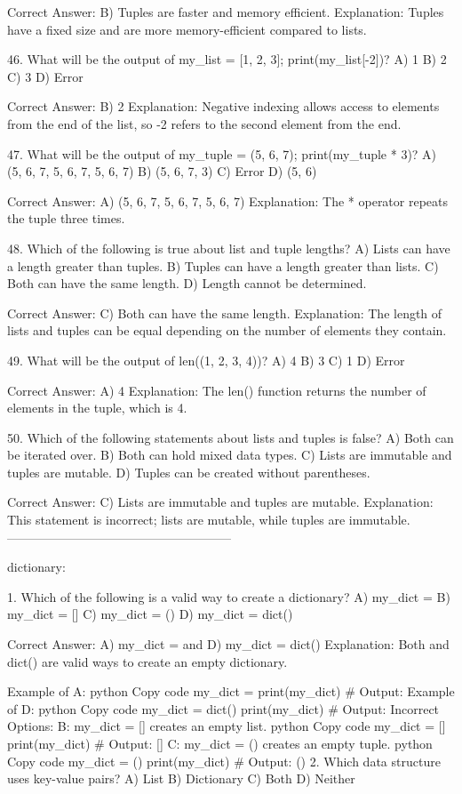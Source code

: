 Correct Answer: B) Tuples are faster and memory efficient.
Explanation: Tuples have a fixed size and are more memory-efficient compared to lists.

46. What will be the output of my_list = [1, 2, 3]; print(my_list[-2])?
A) 1
B) 2
C) 3
D) Error

Correct Answer: B) 2
Explanation: Negative indexing allows access to elements from the end of the list, so -2 refers to the second element from the end.

47. What will be the output of my_tuple = (5, 6, 7); print(my_tuple * 3)?
A) (5, 6, 7, 5, 6, 7, 5, 6, 7)
B) (5, 6, 7, 3)
C) Error
D) (5, 6)

Correct Answer: A) (5, 6, 7, 5, 6, 7, 5, 6, 7)
Explanation: The * operator repeats the tuple three times.

48. Which of the following is true about list and tuple lengths?
A) Lists can have a length greater than tuples.
B) Tuples can have a length greater than lists.
C) Both can have the same length.
D) Length cannot be determined.

Correct Answer: C) Both can have the same length.
Explanation: The length of lists and tuples can be equal depending on the number of elements they contain.

49. What will be the output of len((1, 2, 3, 4))?
A) 4
B) 3
C) 1
D) Error

Correct Answer: A) 4
Explanation: The len() function returns the number of elements in the tuple, which is 4.

50. Which of the following statements about lists and tuples is false?
A) Both can be iterated over.
B) Both can hold mixed data types.
C) Lists are immutable and tuples are mutable.
D) Tuples can be created without parentheses.

Correct Answer: C) Lists are immutable and tuples are mutable.
Explanation: This statement is incorrect; lists are mutable, while tuples are immutable.
------------------------------------------------------

dictionary:

1. Which of the following is a valid way to create a dictionary?
A) my_dict = {}
B) my_dict = []
C) my_dict = ()
D) my_dict = dict()

Correct Answer: A) my_dict = {} and D) my_dict = dict()
Explanation: Both {} and dict() are valid ways to create an empty dictionary.

Example of A:
python
Copy code
my_dict = {}
print(my_dict)  # Output: {}
Example of D:
python
Copy code
my_dict = dict()
print(my_dict)  # Output: {}
Incorrect Options:
B: my_dict = [] creates an empty list.
python
Copy code
my_dict = []
print(my_dict)  # Output: []
C: my_dict = () creates an empty tuple.
python
Copy code
my_dict = ()
print(my_dict)  # Output: ()
2. Which data structure uses key-value pairs?
A) List
B) Dictionary
C) Both
D) Neither

